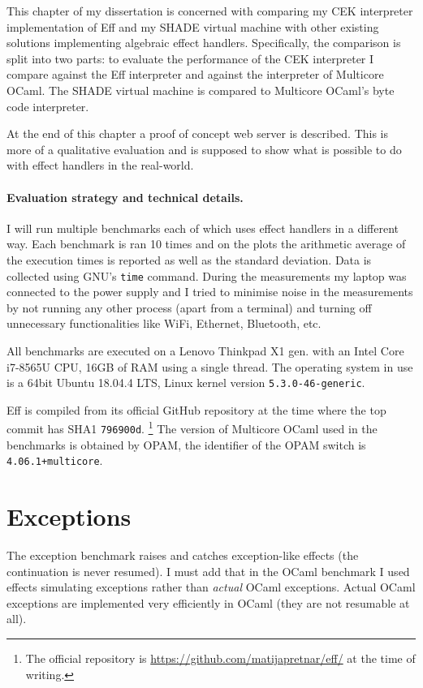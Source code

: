 \documentclass[class=article, crop=false]{standalone}
\begin{document}
This chapter of my dissertation is concerned with comparing my CEK interpreter implementation of Eff and my SHADE virtual machine with
other existing solutions implementing algebraic effect handlers. Specifically, the comparison is split into two parts: to evaluate the performance
of the CEK interpreter I compare against the Eff interpreter and against the interpreter of Multicore OCaml. The SHADE virtual machine is compared
to Multicore OCaml's byte code interpreter.

At the end of this chapter a proof of concept web server is described. This is more of a qualitative evaluation and is supposed to show
what is possible to do with effect handlers in the real-world.

\paragraph{Evaluation strategy and technical details.}

I will run multiple benchmarks each of which uses effect handlers in a different way. Each benchmark is ran 10 times and on the plots
the arithmetic average of the execution times is reported as well as the standard deviation. Data is collected using GNU's \verb|time| command.
During the measurements my laptop was connected to the power supply and I tried to minimise noise in the measurements by not running any other
process (apart from a terminal) and turning off unnecessary functionalities like WiFi, Ethernet, Bluetooth, etc.

All benchmarks are executed on a Lenovo Thinkpad X1  gen. with
an Intel Core i7-8565U CPU, 16GB of RAM using a single thread. The operating system in use is a 64bit Ubuntu 18.04.4 LTS, Linux kernel version \verb|5.3.0-46-generic|.

Eff is compiled from its official GitHub repository at the time where the top commit has SHA1 \verb|796900d|.
\footnote{The official repository is \url{https://github.com/matijapretnar/eff/} at the time of writing.}
The version of Multicore OCaml used in the benchmarks is obtained by OPAM, the identifier of the OPAM switch is \verb|4.06.1+multicore|.

\section{Exceptions}

The exception benchmark raises and catches exception-like effects (the continuation is never resumed). I must add that
in the OCaml benchmark I used effects simulating exceptions rather than \emph{actual} OCaml exceptions. Actual OCaml
exceptions are implemented very efficiently in OCaml (they are not resumable at all).
\end{document}
